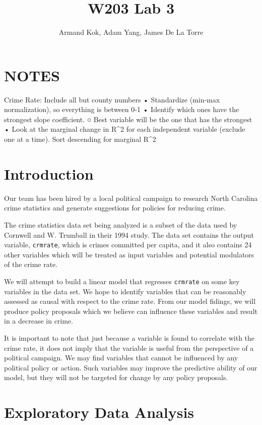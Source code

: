 \documentclass[]{article}
\title{W203 Lab 3}
\author{Armand Kok, Adam Yang, James De La Torre}
\date{}
\begin{document}
\maketitle

\section{NOTES}\label{notes}

Crime Rate: Include all but county numbers • Standardize (min-max
normalization), so everything is between 0-1 • Identify which ones have
the strongest slope coefficient. ○ Best variable will be the one that
has the strongest • Look at the marginal change in R\^{}2 for each
independent variable (exclude one at a time). Sort descending for
marginal R\^{}2

\section{Introduction}\label{introduction}

Our team has been hired by a local political campaign to research North
Carolina crime statistics and generate suggestions for policies for
reducing crime.

The crime statistics data set being analyzed is a subset of the data
used by Cornwell and W. Trumball in their 1994 study. The data set
contains the output variable, \texttt{crmrate}, which is crimes
committed per capita, and it also contains 24 other variables which will
be treated as input variables and potential modulators of the crime
rate.

We will attempt to build a linear model that regresses \texttt{crmrate}
on some key variables in the data set. We hope to identify variables
that can be reasonably assessed as causal with respect to the crime
rate. From our model fidings, we will produce policy proposals which we
believe can influence these variables and result in a decrease in crime.

It is important to note that just because a variable is found to
correlate with the crime rate, it does not imply that the variable is
useful from the perspective of a political campaign. We may find
variables that cannot be influenced by any political policy or action.
Such variables may improve the predictive ability of our model, but they
will not be targeted for change by any policy proposals.

\section{Exploratory Data Analysis}\label{exploratory-data-analysis}
\end{document}
